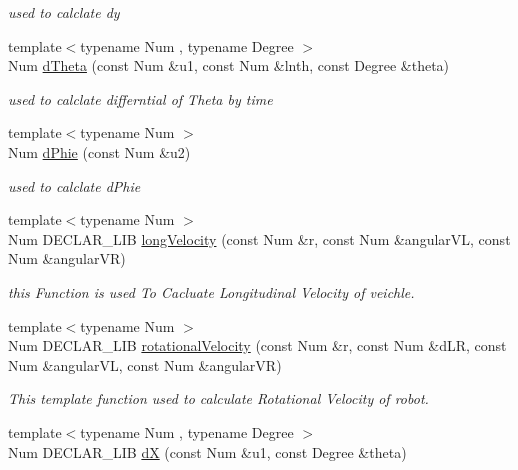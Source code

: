 \begin{DoxyCompactItemize}
\begin{DoxyCompactList}\small\item\em used to calclate dy \end{DoxyCompactList}\item 
{\footnotesize template$<$typename Num , typename Degree $>$ }\\Num \hyperlink{namespace_path_1_1_kinematic_model_ac07cef86cf3d4945b78dee7da264833c}{d\+Theta} (const Num \&u1, const Num \&lnth, const Degree \&theta)
\begin{DoxyCompactList}\small\item\em used to calclate differntial of Theta by time \end{DoxyCompactList}\item 
{\footnotesize template$<$typename Num $>$ }\\Num \hyperlink{namespace_path_1_1_kinematic_model_a00319aff5cc6aaf82439c744b6aea60f}{d\+Phie} (const Num \&u2)
\begin{DoxyCompactList}\small\item\em used to calclate d\+Phie \end{DoxyCompactList}\item 
{\footnotesize template$<$typename Num $>$ }\\Num D\+E\+C\+L\+A\+R\+\_\+\+L\+IB \hyperlink{namespace_path_1_1_kinematic_model_a7cdd5e7f38d713b8e5758d20a0c02b4d}{long\+Velocity} (const Num \&r, const Num \&angular\+VL, const Num \&angular\+VR)
\begin{DoxyCompactList}\small\item\em this Function is used To Cacluate Longitudinal Velocity of veichle. \end{DoxyCompactList}\item 
{\footnotesize template$<$typename Num $>$ }\\Num D\+E\+C\+L\+A\+R\+\_\+\+L\+IB \hyperlink{namespace_path_1_1_kinematic_model_a9f0ac9b3ec75da8cae3bf094e12452fc}{rotational\+Velocity} (const Num \&r, const Num \&d\+LR, const Num \&angular\+VL, const Num \&angular\+VR)
\begin{DoxyCompactList}\small\item\em This template function used to calculate Rotational Velocity of robot. \end{DoxyCompactList}\item 
{\footnotesize template$<$typename Num , typename Degree $>$ }\\Num D\+E\+C\+L\+A\+R\+\_\+\+L\+IB \hyperlink{namespace_path_1_1_kinematic_model_aac9128df256e429b8dced42d09570e40}{dX} (const Num \&u1, const Degree \&theta)

\end{DoxyCompactItemize}
